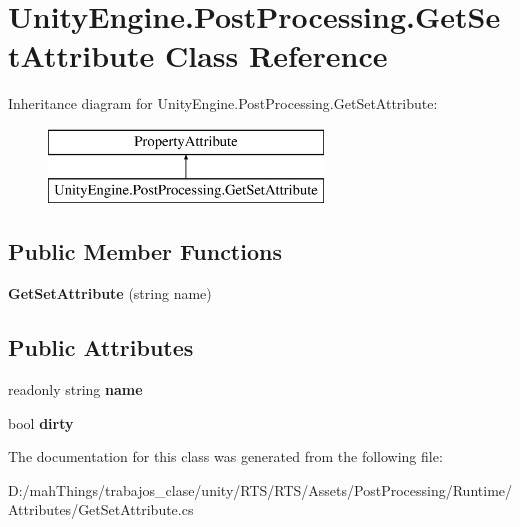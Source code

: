 \hypertarget{class_unity_engine_1_1_post_processing_1_1_get_set_attribute}{}\section{Unity\+Engine.\+Post\+Processing.\+Get\+Set\+Attribute Class Reference}
\label{class_unity_engine_1_1_post_processing_1_1_get_set_attribute}
Inheritance diagram for Unity\+Engine.\+Post\+Processing.\+Get\+Set\+Attribute\+:\begin{figure}[H]
\begin{center}
\leavevmode
\includegraphics[height=2.000000cm]{class_unity_engine_1_1_post_processing_1_1_get_set_attribute}
\end{center}
\end{figure}
\subsection*{Public Member Functions}
\begin{DoxyCompactItemize}
\item 
\mbox{\label{class_unity_engine_1_1_post_processing_1_1_get_set_attribute_a28be93611db1068a1341cd9d376a882c}} 
{\bfseries Get\+Set\+Attribute} (string name)
\end{DoxyCompactItemize}
\subsection*{Public Attributes}
\begin{DoxyCompactItemize}
\item 
\mbox{\label{class_unity_engine_1_1_post_processing_1_1_get_set_attribute_a177f3551073d0f862d77969abb40af98}} 
readonly string {\bfseries name}
\item 
\mbox{\label{class_unity_engine_1_1_post_processing_1_1_get_set_attribute_a370ea457f8789fd73e72f44bca0a1baf}} 
bool {\bfseries dirty}
\end{DoxyCompactItemize}


The documentation for this class was generated from the following file\+:\begin{DoxyCompactItemize}
\item 
D\+:/mah\+Things/trabajos\+\_\+clase/unity/\+R\+T\+S/\+R\+T\+S/\+Assets/\+Post\+Processing/\+Runtime/\+Attributes/Get\+Set\+Attribute.\+cs\end{DoxyCompactItemize}
